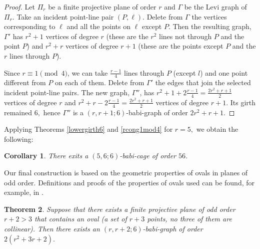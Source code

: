 \documentclass[a4paper,11pt]{article}
\newtheorem{theorem}{Theorem}[section]
\newtheorem{corollary}[theorem]{Corollary}
\begin{document}
\begin{proof}
Let $\Pi _r$ be a finite projective plane of order $r$ and $\Gamma $ be the Levi graph of 
$\Pi _r$. Take an incident point-line pair $(P,\ell )$. 
Delete from $\Gamma $ the vertices 
corresponding to $\ell$ and all the points on $\ell$ except $P$. Then the resulting graph,
$\Gamma'$ has $r^2+1$ vertices of degree $r$ (these are the $r^2$ lines not through $P$ 
and the point $P$) and $r^2+r$ vertices of degree $r+1$ (these are the points except $P$ and
the $r$ lines through $P$).  

Since $r\equiv 1 \pmod 4$, we can take $\frac{r-1}{4}$ lines through $P$ (except $l$) and one point different from $P$ on each of them. Delete from $\Gamma'$ the edges that join the selected 
incident point-line pairs. The new graph, $\Gamma''$, has $r^2+1+2\frac{r-1}{4}=\frac{2r^2+r+1}{2}$ vertices of degree $r$ and $r^2+r-2\frac{r-1}{4}=\frac{2r^2+r+1}{2}$ vertices of degree $r+1$. Its girth 
remained $6,$ hence $\Gamma''$ is a $(r,r+1;6)$-babi-graph of order $2r^2+r+1$. 
\end{proof}

Applying Theorems \ref{lowergirth6} and  \ref{rcong1mod4} for $r=5,$ we obtain the following:
\begin{corollary} There exits a $(5,6;6)$-babi-cage of order $56$. 
\end{corollary}

Our final construction is based on the geometric properties of ovals in planes of odd order.
Definitions and proofs of the properties of ovals used can be found, for example, in \cite[Lemmas 6.12, 6.14]{KSz}.

\begin{theorem}
Suppose that there exists a finite projective plane of odd order $r+2 >3$ 
that contains an oval (a set of $r+3$ points, no three of them are collinear).
Then there exists an 
$(r,r+2;6)$-babi-graph of order $2(r^2+3r+2).$
\end{theorem}
\end{document}
